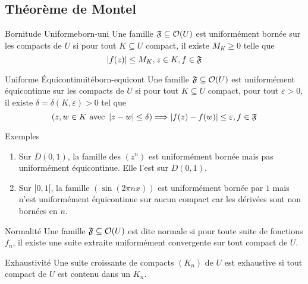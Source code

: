 \documentclass{cours}
\begin{document}
\subsection{Théorème de Montel}
\begin{définition}{Bornitude Uniforme}{born-uni}
	Une famille $\mathfrak{F} \subseteq \mathcal{O}(U)$ est uniformément bornée sur les compacts de $U$ si pour tout $K \subseteq U$ compact, il existe $M_{K} \geq 0$ telle que 
	\[
		\left|f(z)\right| \leq M_{K}, z\in K, f \in \mathfrak{F}
	\]
\end{définition}

\begin{définition}{Uniforme Équicontinuité}{born-equicont}
	Une famille $\mathfrak{F}\subseteq \mathcal{O}(U)$ est uniformément équicontinue sur les compacts de $U$ si pour tout $K \subseteq U$ compact, pour tout $\varepsilon > 0$, il existe $\delta = \delta(K, \varepsilon) > 0$ tel que 
	\[
		\left(z, w \in K \text{ avec } \left|z - w\right| \leq \delta\right) \Longrightarrow \left|f(z) - f(w)\right| \leq \varepsilon, f\in \mathfrak{F}
	\]

	
\end{définition}


\begin{propositionfr}{Exemples}{}
		\begin{enumerate}
			\item Sur $\overline{D}(0, 1)$, la famille des $(z^{n})$ est uniformément bornée mais pas uniformément équicontinue. Elle l'est sur $D(0, 1)$.
			\item Sur $[0, 1[$, la famille $(\sin(2\pi nx))$ est uniformément bornée par $1$ mais n'est uniformément équicontinue sur aucun compact car les dérivées sont non bornées en $n$. 
	\end{enumerate}

\end{propositionfr}

\begin{définition}{Normalité}{}
	Une famille $\mathfrak{F} \subseteq \mathcal{O}(U)$ est dite normale si pour toute suite de fonctions $f_{n}$, il existe une suite extraite uniformément convergente sur tout compact de $U$. 
	
\end{définition}

\begin{définition}{Exhaustivité}{}
	Une suite croissante de compacts $(K_{n})$ de $U$ est exhaustive si tout compact de $U$ est contenu dans un $K_{n}$. 
\end{définition}
\end{document}
